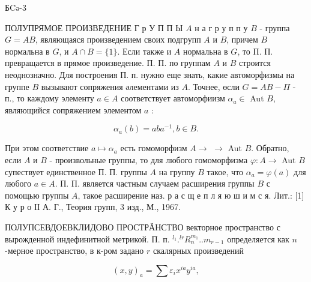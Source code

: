 \documentclass[10pt]{article}
\begin{document}
БCə-3



ПОЛУПРЯМОЕ ПРОИЗВЕДЕНИЕ Г р У П П Ы $A$ н а $г$ р у п п у $B$ - группа $G=A B$, являющаяся произведением своих подгрупп $A$ и $B$, причем $B$ нормальна в $G$, и $A \cap B=\{1\}$. Если также и $A$ нормальна в $G$, то П. П. превращается в прямое произведение. П. П. по группам $A$ и $B$ строится неоднозначно. Для построения П. п. нужно еще знать, какие автоморфизмы на группе $B$ вызывают сопряжения әлементами из $A$. Точнее, өсли $G=A B-\Pi$ - п., то каждому элементу $a \in A$ соответствует автоморфиизм $\alpha_{a} \in$ Aut $B$, являющийся сопряжением элементом $a$ :



\[

\alpha_{a}(b)=a b a^{-1}, b \in B .

\]



При этом соответствие $a \mapsto \alpha_{a}$ есть гомоморфизм $A \rightarrow$ $\rightarrow$ Aut $B$. Обратно, если $A$ и $B$ - произвольные группы, то для любого гомоморфизма $\varphi: A \rightarrow$ Aut $B$ супествует единственное П. П. группы $A$ на группу $B$ такое, что $\alpha_{a}=\varphi(a)$ для любого $a \in A$. П. П. является частным случаем расширения группы $B$ с помощью группы $A$, такое расширение наз. р а с щ е п л я ю ш и м с я. Лит.: [1] К у р о ІІ А. Г., Теория групп, 3 изд., М., 1967.



ПОЛУПСЕВДОЕВКЛИДОВО ПРОСТРӒНСТВО векторное пространство с вырожденной индефинитной метрикой. П. п. ${ }^{l_{1}} .{ }^{l r} R_{n}^{m_{1}} . . m_{r-1}$ определяется как $n$-мерное пространство, в к-ром задано $r$ скалярных произведений



\[

(x, y)_{a}=\sum \varepsilon_{i} x^{i a} y^{i a},

\]
\end{document}

